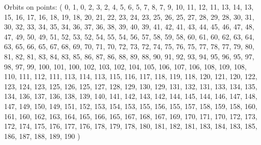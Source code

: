 \documentclass[12pt]{article}
\begin{document}
{\bigskip

Orbits on points: ( 0, 1, 0, 2, 3, 2, 4, 5, 6, 5, 7, 8, 7, 9, 10, 11, 12, 11, 13, 14, 13, 15, 16, 17, 16, 18, 19, 18, 20, 21, 22, 23, 24, 23, 25, 26, 25, 27, 28, 29, 28, 30, 31, 30, 32, 33, 34, 35, 34, 36, 37, 36, 38, 39, 40, 39, 41, 42, 41, 43, 44, 45, 46, 47, 48, 47, 49, 50, 49, 51, 52, 53, 52, 54, 55, 54, 56, 57, 58, 59, 58, 60, 61, 60, 62, 63, 64, 63, 65, 66, 65, 67, 68, 69, 70, 71, 70, 72, 73, 72, 74, 75, 76, 75, 77, 78, 77, 79, 80, 81, 82, 81, 83, 84, 83, 85, 86, 87, 86, 88, 89, 88, 90, 91, 92, 93, 94, 95, 96, 95, 97, 98, 97, 99, 100, 101, 100, 102, 103, 102, 104, 105, 106, 107, 106, 108, 109, 108, 110, 111, 112, 111, 113, 114, 113, 115, 116, 117, 118, 119, 118, 120, 121, 120, 122, 123, 124, 123, 125, 126, 125, 127, 128, 129, 130, 129, 131, 132, 131, 133, 134, 135, 134, 136, 137, 136, 138, 139, 140, 141, 142, 143, 142, 144, 145, 144, 146, 147, 148, 147, 149, 150, 149, 151, 152, 153, 154, 153, 155, 156, 155, 157, 158, 159, 158, 160, 161, 160, 162, 163, 164, 165, 166, 165, 167, 168, 167, 169, 170, 171, 170, 172, 173, 172, 174, 175, 176, 177, 176, 178, 179, 178, 180, 181, 182, 181, 183, 184, 183, 185, 186, 187, 188, 189, 190 )\\


%


%


}%
\end{document}
